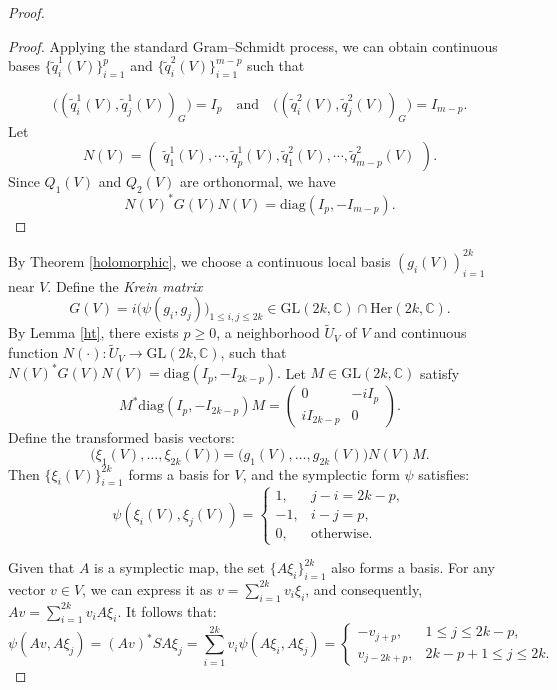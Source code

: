 \documentclass[11pt]{amsart}
\theoremstyle{remark}
\theoremstyle{definition}
\newcommand{\C}{{\mathbf C}}
\def \C{{\mathcal{C}}}
\def\C{{\mathbb C}}
\begin{document}
\begin{proof}
\begin{proof}
			Applying the standard Gram–Schmidt process, we can obtain continuous bases $\{\tilde{q}^1_i(V)\}_{i=1}^p$ and $\{\tilde{q}^2_i(V)\}_{i=1}^{m-p}$ such that
			
			$$
			\big((\tilde{q}^1_i(V),\tilde{q}^1_j(V))_G\big) = I_p \quad \text{and} \quad \big((\tilde{q}^2_i(V),\tilde{q}^2_j(V))_G\big) = I_{m-p}.
			$$
			Let
			$$
			N(V) = \begin{pmatrix}
				\tilde{q}^1_1(V), \cdots, \tilde{q}^1_p(V), \tilde{q}^2_1(V), \cdots, \tilde{q}^2_{m-p}(V)
			\end{pmatrix}.
			$$
			Since $Q_1(V)$ and $Q_2(V)$ are orthonormal, we have
			$$
			N(V)^* G(V) N(V) = \text{diag}(I_p, -I_{m-p}).
			$$
    
\end{proof}


By Theorem \ref{holomorphic}, we choose a continuous local basis \((g_i(V))_{i=1}^{2k}\) near \( V \). Define the \textit{Krein matrix} 
\[
G(V) = i \big( \psi(g_i, g_j) \big)_{1 \leq i,j \leq 2k} \in \mathrm{GL}(2k, \mathbb{C})\cap \mathrm{Her}(2k,\C).
\]
By Lemma \ref{ht}, there exists $p\geq 0$, a neighborhood $\tilde{U}_V$ of $V$ and continuous function $N(\cdot): \tilde{U}_V\rightarrow \mathrm{GL}(2k, \mathbb{C}) $,  such that $N(V)^*G(V)N(V)=\text{diag}(I_p, -I_{2k-p}).$
Let \(M \in \mathrm{GL}(2k, \mathbb{C})\) satisfy
\[
M^* \mathrm{diag}(I_p, -I_{2k-p}) M = \begin{pmatrix}
0 & -iI_p \\
iI_{2k-p} & 0
\end{pmatrix}.
\]
Define the transformed basis vectors:
\[
\big( \xi_1(V), \ldots, \xi_{2k}(V) \big) = \big( g_1(V), \ldots, g_{2k}(V) \big) N(V) M.
\]
Then \(\{\xi_i(V)\}_{i=1}^{2k}\) forms a basis for \( V \), and the symplectic form \(\psi\) satisfies:
\[
\psi(\xi_i(V), \xi_j(V)) = \begin{cases}
1, & j - i = 2k - p, \\
-1, & i - j = p, \\
0, & \text{otherwise}.
\end{cases}
\]

 Given that $ A $ is a symplectic map, the set $\{A\xi_i\}_{i=1}^{2k}$ also forms a  basis.
For any vector $ v \in V $, we can express it as $ v = \sum_{i=1}^{2k} v_i \xi_i $, and consequently, $ Av = \sum_{i=1}^{2k} v_i A\xi_i $. It follows that:
\begin{equation*}\label{sbasis}
    \psi(Av, A\xi_j) = (Av)^* S A\xi_j = \sum_{i=1}^{2k} v_i \psi(A\xi_i, A\xi_j) = \begin{cases}
	-v_{j+p}, & 1 \leq j \leq 2k-p, \\
	v_{j-2k+p}, & 2k-p+1 \leq j \leq 2k.
\end{cases}
\end{equation*}



\end{proof}
\end{document}
